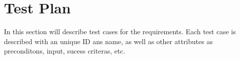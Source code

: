 \chapter{Test Plan}
	
	In this section will describe test cases for the requirements. 
	Each test case is described with an unique ID ans name, as well as 
	other attributes as preconditons, input, sucess criteras, etc. 


	\clearpage
	
	\clearpage
	
	\clearpage
	
	\clearpage
	